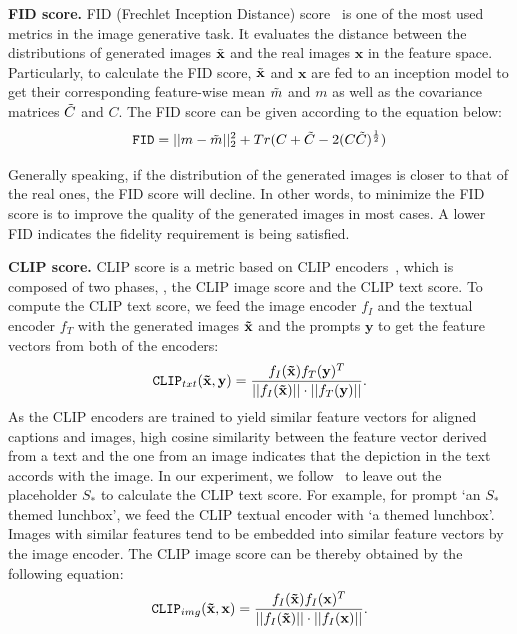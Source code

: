\noindent \textbf{FID score.} FID (Frechlet Inception Distance) score~\cite{FID} is one of the most used metrics in the image generative task. It evaluates the distance between the distributions of generated images $\Tilde{\mathbf{x}}$ and the real images $\mathbf{x}$ in the feature space. Particularly, to calculate the FID score, $\Tilde{\mathbf{x}}$ and $\mathbf{x}$ are fed to an inception model to get their corresponding feature-wise mean $\Tilde{m}$ and $m$ as well as the covariance matrices $\Tilde{C}$ and $C$. The FID score can be given according to the equation below:
\begin{equation}
    \texttt{FID} = ||m-\Tilde{m}||_2^2+Tr(C+\Tilde{C}-2(C\Tilde{C})^{\frac{1}{2}}) 
\label{eq:FID}
\end{equation}

Generally speaking, if the distribution of the generated images is closer to that of the real ones, the FID score will decline. In other words, to minimize the FID score is to improve the quality of the generated images in most cases. A lower FID indicates the fidelity requirement is being satisfied.

\noindent \textbf{CLIP score.} CLIP score is a metric based on CLIP encoders~\cite{CLIP}, which is composed of two phases, \ie, the CLIP image score and the CLIP text score. To compute the CLIP text score, we feed the image encoder $f_I$ and the textual encoder $f_T$ with the generated images $\mathbf{\Tilde{x}}$ and the prompts $\mathbf{y}$ to
get the feature vectors from both of the encoders:
\begin{equation}
    \texttt{CLIP}_{txt}(\mathbf{\Tilde{x}}, \mathbf{y})=\frac{f_I(\mathbf{\Tilde{x}})f_T(\mathbf{y})^T}{||f_I(\mathbf{\Tilde{x}})||\cdot||f_T(\mathbf{y})||}.
\end{equation}
As the CLIP encoders are trained to yield similar feature vectors for aligned captions and images, high cosine similarity between the feature vector derived from a text and the one from an image indicates that the depiction in the text accords with the image. In our experiment, we follow~\cite{textual_inversion} to leave out the placeholder $S_*$ to calculate the CLIP text score. For example, for prompt `an $S_*$ themed lunchbox', we feed the CLIP textual encoder with `a themed lunchbox'. 
Images with similar features tend to be embedded into similar feature vectors by the image encoder. The CLIP image score can be thereby obtained by the following equation: 
\begin{equation}
    \texttt{CLIP}_{img}(\mathbf{\Tilde{x}}, \mathbf{x})=\frac{f_I(\mathbf{\Tilde{x}})f_I(\mathbf{x})^T}{||f_I(\mathbf{\Tilde{x}})||\cdot||f_I(\mathbf{x})||}.
\end{equation}

